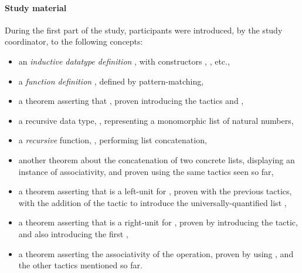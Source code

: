 \paragraph{Study material}

During the first part of the study, participants were introduced, by the study
coordinator, to the following concepts:

\begin{itemize}

\item an \emph{inductive datatype definition} , with constructors
, , etc.,

\item a \emph{function definition} , defined by
pattern-matching,

\item a theorem asserting that , proven
introducing the tactics  and ,

\item a recursive data type, , representing a monomorphic
list of natural numbers,

\item a \emph{recursive} function, , performing list
concatenation,

\item another theorem about the concatenation of two concrete lists, displaying
an instance of associativity, and proven using the same tactics seen so far,

\item a theorem asserting that  is a left-unit for
, proven with the previous tactics, with the addition of the
 tactic to introduce the universally-quantified list
,

\item a theorem asserting that  is a right-unit for
, proven by introducing the  tactic, and
also introducing the first ,

\item a theorem asserting the associativity of the  operation,
proven by using , and the other tactics mentioned so far.

\end{itemize}

